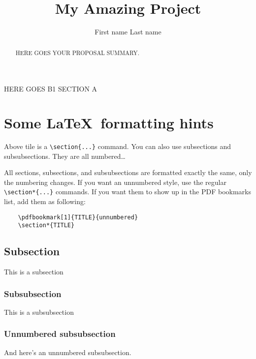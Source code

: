 \documentclass[11pt, a4paper]{article}
\author[Last name]{First name Last name}
\title{My Amazing Project}
\begin{document}
\maketitle

\begin{abstract}
HERE GOES YOUR PROPOSAL SUMMARY.
\end{abstract}


\startsectiona
HERE GOES B1 SECTION A

\section{Some \LaTeX\ formatting hints}

Above tile is a \verb=\section{...}= command. You can also use subsections and subsubsections. They are all numbered\dots

All sections, subsections, and subsubsections are formatted exactly the same, only the numbering changes. If you want an unnumbered style, use the regular \verb=\section*{...}= commands.
If you want them to show up in the PDF bookmarks list, add them as following:
\begin{verbatim}
    \pdfbookmark[1]{TITLE}{unnumbered}
    \section*{TITLE}
\end{verbatim}

\subsection{Subsection}

This is a subsection 

\subsubsection{Subsubsection}

This is a subsubsection

\subsubsection*{Unnumbered subsubsection}
And here's an unnumbered subsubsection.
\end{document}
